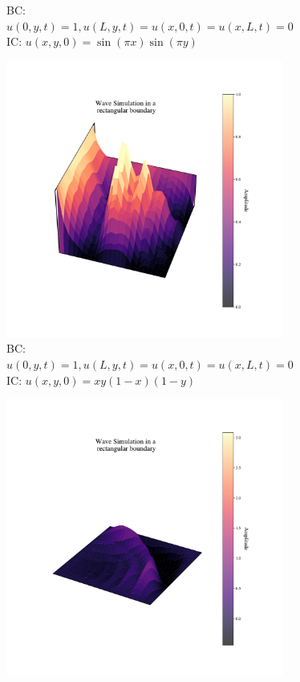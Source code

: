 \documentclass{article}
\begin{document}
\begin{figure}[htbp]
\begin{subfigure}{0.45\textwidth}
        \caption{BC: \(u(0, y, t) = 1, u(L, y, t) = u(x, 0, t) = u(x, L, t) = 0\)\\ IC: \(u(x, y, 0) = \sin(\pi x) \sin(\pi y)\)}
    \end{subfigure}
    \begin{subfigure}{0.45\textwidth}
        \centering
        \includegraphics[width=\textwidth]{figures/Figure_3.pdf}
        \caption{BC: \(u(0, y, t) = 1, u(L, y, t) = u(x, 0, t) = u(x, L, t) = 0\)\\ IC: \(u(x, y, 0) = x y (1-x) (1-y)\)}
    \end{subfigure}%
    \hfill
    \begin{subfigure}{0.45\textwidth}
        \centering
        \includegraphics[width=\textwidth]{figures/Figure_4.pdf}

\end{subfigure}
\end{figure}
\end{document}
